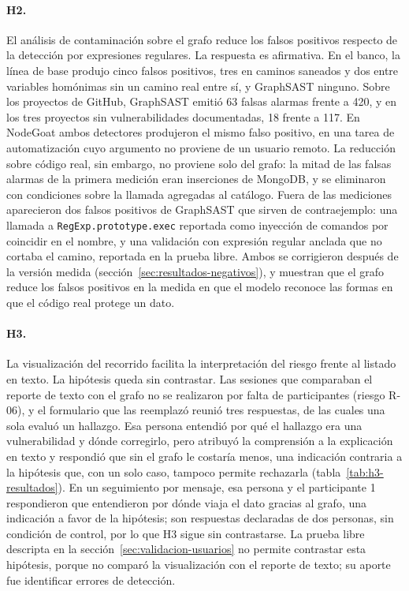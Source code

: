 \paragraph{H2.} El análisis de contaminación sobre el grafo reduce los
falsos positivos respecto de la detección por expresiones regulares. La
respuesta es afirmativa. En el banco, la línea de base produjo cinco
falsos positivos, tres en caminos saneados y dos entre variables
homónimas sin un camino real entre sí, y GraphSAST ninguno. Sobre los
proyectos de GitHub, GraphSAST emitió 63 falsas alarmas frente a 420, y
en los tres proyectos sin vulnerabilidades documentadas, 18 frente a 117.
En NodeGoat ambos detectores produjeron el mismo falso positivo, en una
tarea de automatización cuyo argumento no proviene de un usuario remoto.
La reducción sobre código real, sin embargo, no proviene solo del grafo:
la mitad de las falsas alarmas de la primera medición eran inserciones
de MongoDB, y se eliminaron con condiciones sobre la llamada agregadas al
catálogo. Fuera de
las mediciones aparecieron dos falsos positivos de GraphSAST que sirven
de contraejemplo: una llamada a \texttt{RegExp.prototype.exec} reportada
como inyección de comandos por coincidir en el nombre, y una validación
con expresión regular anclada que no cortaba el camino, reportada en la
prueba libre. Ambos se corrigieron después de la versión medida
(sección~\ref{sec:resultados-negativos}), y muestran que el grafo reduce
los falsos positivos en la medida en que el modelo reconoce las formas
en que el código real protege un dato.

\paragraph{H3.} La visualización del recorrido facilita la
interpretación del riesgo frente al listado en texto.
La hipótesis queda sin contrastar. Las sesiones que
comparaban el reporte de texto con el grafo no se realizaron por falta de
participantes (riesgo R-06), y el formulario que las reemplazó reunió
tres respuestas, de las cuales una sola evaluó un hallazgo. Esa persona
entendió por qué el hallazgo era una vulnerabilidad y dónde corregirlo,
pero atribuyó la comprensión a la explicación en texto y respondió que
sin el grafo le costaría menos, una indicación contraria a la hipótesis
que, con un solo caso, tampoco permite rechazarla
(tabla~\ref{tab:h3-resultados}). En un seguimiento por mensaje, esa
persona y el participante 1 respondieron que entendieron por dónde viaja
el dato gracias al grafo, una indicación a favor de la hipótesis; son
respuestas declaradas de dos personas, sin condición de control, por lo
que H3 sigue sin contrastarse. La prueba libre descripta en la
sección~\ref{sec:validacion-usuarios} no permite contrastar esta
hipótesis, porque no comparó la visualización con el reporte de texto;
su aporte fue identificar errores de detección.

